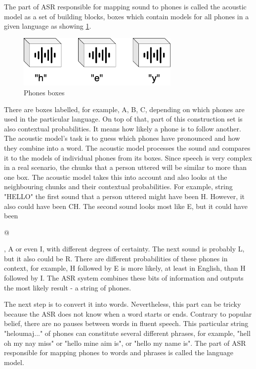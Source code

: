 The part of ASR responsible for mapping sound to phones is called the acoustic model as a set of building blocks, boxes which contain models for all phones in a given language as showing \cref{fig:phones_boxes}.

\begin{figure}[H]
    \centering
    \includegraphics[width=0.7\textwidth]{img/phones_boxes.png}
    \caption{Phones boxes}
    \label{fig:phones_boxes}
\end{figure}

There are boxes labelled, for example, A, B, C, depending on which phones are used in the particular language. On top of that, part of this construction set is also contextual probabilities. It means how likely a phone is to follow another. The acoustic model's task is to guess which phones have pronounced and how they combine into a word. The acoustic model processes the sound and compares it to the models of individual phones from its boxes. Since speech is very complex in a real scenario, the chunks that a person uttered will be similar to more than one box. The acoustic model takes this into account and also looks at the neighbouring chunks and their contextual probabilities. For example, string "HELLO" the first sound that a person uttered might have been H. However, it also could have been CH. The second sound looks most like E, but it could have been \begin{IPA}@\end{IPA} , A or even I, with different degrees of certainty. The next sound is probably L, but it also could be R. There are different probabilities of these phones in context, for example, H followed by E is more likely, at least in English, than H followed by I. The ASR system combines these bits of information and outputs the most likely result - a string of phones.\citep{stanislav_petr_2020}

The next step is to convert it into words. Nevertheless, this part can be tricky because the ASR does not know when a word starts or ends. Contrary to popular belief, there are no pauses between words in fluent speech. This particular string "heloumaj..." of phones can constitute several different phrases, for example, "hell oh my nay miss" or "hello mine aim is", or "hello my name is". The part of ASR responsible for mapping phones to words and phrases is called the language model.

